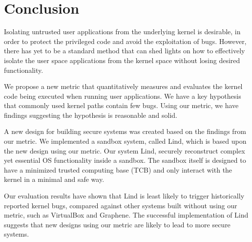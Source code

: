\section{Conclusion}
\label{sec.conclusion}

Isolating untrusted user applications from the underlying kernel is desirable, in order to protect the privileged code and 
avoid the exploitation of bugs. However, there has yet to be a standard method that can shed lights on how to effectively
isolate the user space applications from the kernel space without losing desired functionality.

We propose a new metric that quantitatively measures and evaluates the kernel code being executed when running
user applications. We have a key hypothesis that commonly used kernel paths contain few bugs. Using our metric, 
we have findings suggesting the hypothesis is reasonable and solid. 

A new design for building secure systems was created based on the findings from our metric. 
We implemented a sandbox system, called Lind, which is based upon the new design using our metric. 
Our system Lind, securely reconstruct complex yet essential OS functionality inside a sandbox. 
The sandbox itself is designed to have a minimized trusted computing base (TCB) and only interact with the kernel
in a minimal and safe way. 

Our evaluation results have shown that Lind is least likely to trigger historically reported kernel bugs, compared against
other systems built without using our metric, such as VirtualBox and Graphene. The successful implementation of Lind
suggests that new designs using our metric are likely to lead to more secure systems. 